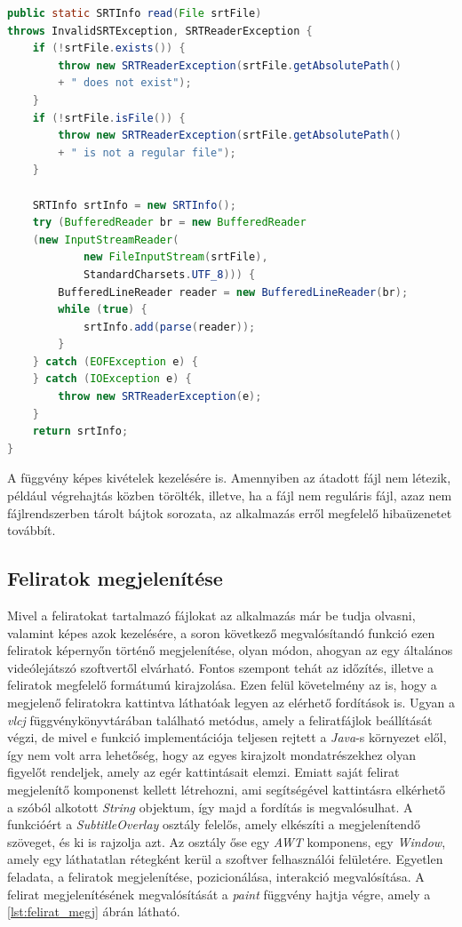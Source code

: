 \begin{spacing}{1.25}
\begin{lstlisting}[caption=Srt fájlok feldolgozása, label={lst:srt_feldolgozas}, language=java,  showstringspaces=false]
public static SRTInfo read(File srtFile) 
throws InvalidSRTException, SRTReaderException {
    if (!srtFile.exists()) {
        throw new SRTReaderException(srtFile.getAbsolutePath()
        + " does not exist");
    }
    if (!srtFile.isFile()) {
        throw new SRTReaderException(srtFile.getAbsolutePath()
        + " is not a regular file");
    }

    SRTInfo srtInfo = new SRTInfo();
    try (BufferedReader br = new BufferedReader
    (new InputStreamReader(
            new FileInputStream(srtFile),
            StandardCharsets.UTF_8))) {
        BufferedLineReader reader = new BufferedLineReader(br);
        while (true) {
            srtInfo.add(parse(reader));
        }
    } catch (EOFException e) {
    } catch (IOException e) {
        throw new SRTReaderException(e);
    }
    return srtInfo;
}
\end{lstlisting}
\end{spacing}

  A függvény képes kivételek kezelésére is. Amennyiben az átadott fájl nem létezik, például végrehajtás közben törölték, illetve, ha a fájl nem reguláris fájl, azaz nem fájlrendszerben tárolt bájtok sorozata, az alkalmazás erről megfelelő hibaüzenetet továbbít.
  
\subsection{Feliratok megjelenítése}
Mivel a feliratokat tartalmazó fájlokat az alkalmazás már be tudja olvasni, valamint képes azok kezelésére, a soron következő megvalósítandó funkció ezen feliratok képernyőn történő megjelenítése, olyan módon, ahogyan az egy általános videólejátszó szoftvertől elvárható. Fontos szempont tehát az időzítés, illetve a feliratok megfelelő formátumú kirajzolása. Ezen felül követelmény az is, hogy a megjelenő feliratokra kattintva láthatóak legyen az elérhető fordítások is. Ugyan a \textit{vlcj} függvénykönyvtárában található metódus, amely a feliratfájlok beállítását végzi, de mivel e funkció implementációja teljesen rejtett a \textit{Java}-s környezet elől, így nem volt arra lehetőség, hogy az egyes kirajzolt mondatrészekhez olyan figyelőt rendeljek, amely az egér kattintásait elemzi. Emiatt saját felirat megjelenítő komponenst kellett létrehozni, ami segítségével kattintásra elkérhető a szóból alkotott \textit{String} objektum, így majd a fordítás is megvalósulhat. A funkcióért a \textit{Subtitle\-Overlay} osztály felelős, amely elkészíti a megjelenítendő szöveget, és ki is rajzolja azt. Az osztály őse egy \textit{AWT} komponens, egy \textit{Window}, amely egy láthatatlan rétegként kerül a szoftver felhasználói felületére. Egyetlen feladata, a feliratok megjelenítése, pozicionálása, interakció megvalósítása. A felirat megjelenítésének megvalósítását a \textit{paint} függvény hajtja végre, amely a \ref{lst:felirat_megj} ábrán látható.


